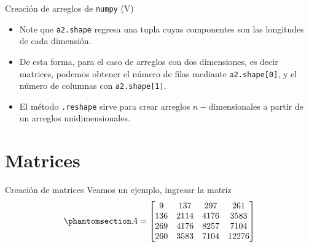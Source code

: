 \documentclass[
  ignorenonframetext,
  aspectratio=169,
  spanish,
]{beamer}
\begin{document}
\begin{frame}[fragile]{Creación de arreglos de \texttt{numpy} (V)}
\label{creaciuxf3n-de-arreglos-de-numpy-v}
\begin{itemize}
\item
  Note que \texttt{a2.shape} regresa una tupla cuyas componentes son las
  longitudes de cada dimensión.
\item
  De esta forma, para el caso de arreglos con dos dimensiones, es decir
  matrices, podemos obtener el número de filas mediante
  \texttt{a2.shape{[}0{]}}, y el número de columnas con
  \texttt{a2.shape{[}1{]}}.
\item
  El método \texttt{.reshape}  sirve para
  crear arreglos \(n-\)dimensionales a partir de un arreglos
  unidimensionales.
\end{itemize}
\end{frame}

\section{Matrices}\label{matrices}

\begin{frame}{Creación de matrices}
\label{creaciuxf3n-de-matrices}
Veamos un ejemplo, ingresar la matriz
\begin{equation}\phantomsection\label{eq-matrizxtxe}{A=\begin{bmatrix}
  9 & 137 &297 &261 \\
  136 & 2114 &4176 &3583 \\
  269 &4176 &8257 &7104 \\
  260 & 3583 &7104 &12276
\end{bmatrix}}\end{equation}
\end{frame}
\end{document}
